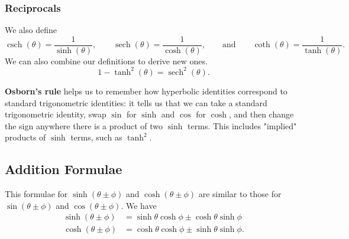 \documentclass[10pt, a4paper]{article}
\DeclareMathOperator{\sech}{sech}
\DeclareMathOperator{\csch}{csch}
\begin{document}
\subsubsection{Reciprocals}
We also define
\[
\csch (\theta) = \frac{1}{\sinh (\theta)},\qquad\sech (\theta) = \frac{1}{\cosh (\theta)},\qquad\text{and}\qquad\coth (\theta) = \frac{1}{\tanh (\theta)}.
\]
We can also combine our definitions to derive new ones.
\[
1 - \tanh ^ 2 (\theta) = \sech ^ 2 (\theta).
\]

\textbf{Osborn's rule} helps us to remember how hyperbolic identities correspond to standard trigonometric identities: it tells us that we can take a standard trigonometric identity, swap $\sin$ for $\sinh$ and $\cos$ for $\cosh$, and then change the sign anywhere there is a product of two $\sinh$ terms. This includes "implied" products of $\sinh$ terms, such as $\tanh ^ 2$.

\subsection{Addition Formulae}
This formulae for $\sinh (\theta \pm \phi)$ and $\cosh (\theta \pm \phi)$ are similar to those for $\sin (\theta \pm \phi)$ and $\cos (\theta \pm \phi)$. We have
\begin{align*}
    \sinh (\theta \pm \phi) &= \sinh \theta \cosh \phi \pm \cosh \theta \sinh \phi \\
    \cosh (\theta \pm \phi) &= \cosh \theta \cosh \phi \pm \sinh \theta \sinh \phi.
\end{align*}
\end{document}
